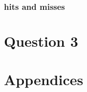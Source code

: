 \documentclass[12pt]{article}
\begin{document}
      \subsubsection{hits and misses}


  \section{Question 3}

  \newpage
  \printbibliography
  \newpage

  \appendix
  \section*{Appendices}
  \renewcommand{\thesubsection}{\Alph{subsection}}

\end{document}
